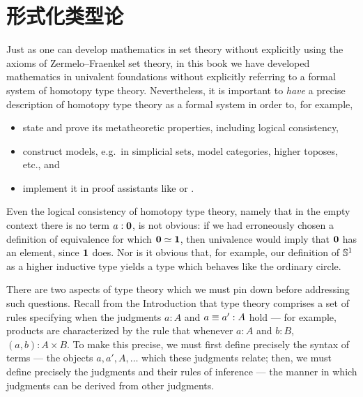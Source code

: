 
\chapter{形式化类型论}
\label{cha:rules}

%
%
%

Just as one can develop mathematics in set theory without explicitly using the axioms of Zermelo--Fraenkel set theory, 
in this book we have developed mathematics in univalent foundations without explicitly referring to a formal
system of homotopy type theory. Nevertheless, it is important to \emph{have} a
precise description of homotopy type theory as a formal system in order to, for example,
%
\begin{itemize}
\item state and prove its metatheoretic properties, including logical
consistency,
\item construct models, e.g.\  in simplicial sets, model categories, higher toposes,
etc., and
\item implement it in proof assistants like \Coq or \Agda.
\end{itemize}
%
Even the logical consistency of homotopy type theory, namely that in the empty context there is no term $a:\mathbf{0}$, is not obvious: if we had erroneously
chosen a definition of equivalence for which $\mathbf{0} \simeq \mathbf{1}$, then
univalence would imply that $\mathbf{0}$ has an element, since $\mathbf{1}$ does.
Nor is it obvious that, for example, our definition of $\mathbb{S}^1$ as a higher
inductive type yields a type which behaves like the ordinary circle.

There are two aspects of type theory which we must pin down before addressing
such questions. Recall from the Introduction that type theory
comprises a set of rules specifying when the judgments $a:A$ and $a\equiv a':A$
hold --- for example, products are characterized by the rule that whenever $a:A$
and $b:B$, $(a,b):A\times B$. To make this precise, we must first define
precisely the syntax of terms --- the objects $a,a',A,\dots$ which these judgments
relate; then, we must define precisely the judgments and their rules of
inference --- the manner in which judgments can be derived from other judgments.

